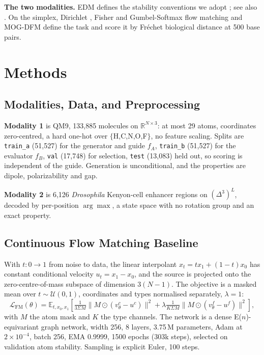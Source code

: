 \textbf{The two modalities.} EDM defines the stability conventions we adopt
\citep{hoogeboom2022equivariant}; see also
\citep{xu2022geodiff,irwin2024semlaflow,song2023equifm,bao2023eegsde}. On the simplex,
Dirichlet \citep{stark2024dirichlet}, Fisher \citep{davis2024fisher} and Gumbel-Softmax
\citep{tang2025gumbel} flow matching and MOG-DFM \citep{chen2025mogdfm} define the task
and score it by Fr\'echet biological distance at 500 base pairs.

\section{Methods}

\subsection{Modalities, Data, and Preprocessing}
\label{sec:data}

\textbf{Modality 1} is QM9, 133{,}885 molecules on $\mathbb{R}^{N\times3}$: at most 29
atoms, coordinates zero-centred, a hard one-hot over $\{$H,C,N,O,F$\}$, no feature
scaling. Splits are \texttt{train\_a} (51{,}527) for the generator and guide $f_A$,
\texttt{train\_b} (51{,}527) for the evaluator $f_B$, \texttt{val} (17{,}748) for
selection, \texttt{test} (13{,}083) held out, so scoring is independent of the guide.
Generation is unconditional, and the properties are dipole, polarizability and gap.

\textbf{Modality 2} is 6{,}126 \emph{Drosophila} Kenyon-cell enhancer regions on
$(\Delta^3)^L$, decoded by per-position $\arg\max$, a state space with no rotation
group and an exact property.

\subsection{Continuous Flow Matching Baseline}
\label{sec:fm}

With $t:0\to1$ from noise to data, the linear interpolant $x_t = t x_1 + (1-t) x_0$ has
constant conditional velocity $u_t=x_1-x_0$, and the source is projected onto the
zero-centre-of-mass subspace of dimension $3(N-1)$. The objective is a masked mean over
$t\sim\mathcal{U}(0,1)$, coordinates and types normalised separately, $\lambda=1$:
\begin{equation}
\mathcal{L}_{\mathrm{FM}}(\theta)=
\mathbb{E}_{t,x_0,x_1}\!\left[
\tfrac{1}{3\Sigma M}\big\|M\odot(v^{c}_\theta - u^{c})\big\|^2
+\lambda\tfrac{1}{K\Sigma M}\big\|M\odot(v^{f}_\theta - u^{f})\big\|^2
\right],
\label{eq:fmloss}
\end{equation}
with $M$ the atom mask and $K$ the type channels. The network is a dense
E($n$)-equivariant graph network, width 256, 8 layers, 3.75\,M parameters, Adam at
$2\times10^{-4}$, batch 256, EMA 0.9999, 1500 epochs (303k steps), selected on
validation atom stability. Sampling is explicit Euler, 100 steps.

